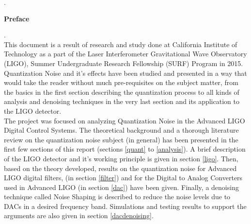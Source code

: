 \documentclass[a4paper,12pt]{article}
\begin{document}
.\\[2\baselineskip]
\begin{center}
\textbf{\LARGE{Preface}}
\end{center}
.\\[2\baselineskip]
This document is a result of research and study done at California Institute of Technology as a part of the Laser Interferometer Gravitational Wave Observatory (LIGO), Summer Undergraduate Research Fellowship (SURF) Program in 2015. Quantization Noise and it's effects have been studied and presented in a way that would take the reader without much pre-requisites on the subject matter, from the basics in the first section describing the quantization process to all kinds of analysis and denoising techniques in the very last section and its application to the LIGO detector. \\
The project was focused on analyzing Quantization Noise in the Advanced LIGO Digital Control Systems. The theoretical background and a thorough literature review on the quantization noise subject (in general) has been presented in the first few sections of this report (sections \ref{quant} to \ref{analysis}). A brief description of the LIGO detector and it's working principle is given in section \ref{ligo}. Then, based on the theory developed, results on the quantization noise for Advanced LIGO digital filters, (in section \ref{filter}) and for the Digital to Analog Converters used in Advanced LIGO (in section \ref{dac}) have been given. Finally, a denoising technique called Noise Shaping is described to reduce the noise levels due to DACs in a desired frequency band. Simulations and testing results to support the arguments are also given in section \ref{dacdenoising}. \\
\\\\\\\\\\\\\\\\\\\\\\\\\\\\\\
\end{document}
